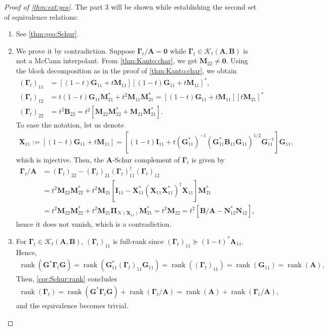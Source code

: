 \documentclass[noinfoline]{imsart}\setcounter{tocdepth}{2}
\newcommand{\m}[1]{\mathbf{#1}} %
\renewcommand{\c}[1]{\mathcal{#1}} %
\DeclareMathOperator*{\rk}{rank}
\theoremstyle{plain}
\begin{document}
\begin{proof}[Proof of \cref{thm:ext:geo}]
The part 3 will be shown while establishing the second set of equivalence relations:
\begin{enumerate}
\item [$(a \Rightarrow b)$] See \cref{thm:geo:Schur}.
\item [$(b \Rightarrow a)$] We prove it by contradiction. Suppose $\m{\Gamma}_{t}/\m{A} = \m{0}$ while $\m{\Gamma}_{t} \in \c{K}_{t}(\m{A}, \m{B})$ is not a McCann interpolant. From \cref{thm:Kanto:char}, we get $\m{M}_{22} \ne \m{0}$. Using the block decomposition as in the proof of \cref{thm:Kanto:char}, we obtain
\begin{align*}
    (\m{\Gamma}_{t})_{11} &= [(1-t) \m{G}_{11} + t \m{M}_{11}] [(1-t) \m{G}_{11} + t \m{M}_{11}]^{*}, \\
    (\m{\Gamma}_{t})_{12} &= t(1-t) \m{G}_{11} \m{M}_{21}^{*} + t^{2} \m{M}_{11} \m{M}_{21}^{*}
    = [(1-t) \m{G}_{11} + t \m{M}_{11}][t \m{M}_{21}]^{*} \\
    (\m{\Gamma}_{t})_{22} &= t^{2} \m{B}_{22} = t^{2}[\m{M}_{22} \m{M}_{22}^{*} + \m{M}_{21} \m{M}_{21}^{*}].
\end{align*}
To ease the notation, let us denote 
\begin{align*}
    \m{X}_{11} := [(1-t) \m{G}_{11} + t \m{M}_{11}] = [(1-t) \m{I}_{11} + t (\m{G}_{11}^{*})^{-1} (\m{G}_{11}^{*} \m{B}_{11} \m{G}_{11})^{1/2} \m{G}_{11}^{-1}] \m{G}_{11}, 
\end{align*}
which is injective. Then, the $\m{A}$-Schur complement of $\m{\Gamma}_{t}$ is given by
\begin{align*}
    \m{\Gamma}_{t}/\m{A} &= (\m{\Gamma}_{t})_{22} - (\m{\Gamma}_{t})_{21} (\m{\Gamma}_{t})_{11}^{\dagger} (\m{\Gamma}_{t})_{12} \\
    &= t^{2} \m{M}_{22} \m{M}_{22}^{*} + t^{2} \m{M}_{21} \left[ \m{I}_{11} - \m{X}_{11}^{*} (\m{X}_{11} \m{X}_{11}^{*})^{\dagger} \m{X}_{11}  \right] \m{M}_{21}^{*} \\
    &= t^{2} \m{M}_{22} \m{M}_{22}^{*} + t^{2} \m{M}_{21} \m{\Pi}_{\c{N}(\m{X}_{11})} \m{M}_{21}^{*} = t^{2} \m{M}_{22} = t^{2} [\m{B}/\m{A} - \m{N}_{12}^{*} \m{N}_{12}],
\end{align*}
hence it does not vanish, which is a contradiction.
\item [$(b \Leftrightarrow c)$] For $\m{\Gamma}_{t} \in \c{K}_{t}(\m{A}, \m{B})$, $(\m{\Gamma}_{t})_{11}$ is full-rank since $(\m{\Gamma}_{t})_{11} \succeq (1-t)^{*} \m{A}_{11}$. Hence,
\begin{align*}
    \rk (\m{G}^{*} \m{\Gamma}_{t} \m{G}) = \rk (\m{G}_{11}^{*} (\m{\Gamma}_{t})_{11} \m{G}_{11})
    = \rk ((\m{\Gamma}_{t})_{11}) = \rk (\m{G}_{11}) = \rk (\m{A}),
\end{align*}
Then, \cref{cor:Schur:rank} concludes
\begin{align*}
    \rk(\m{\Gamma}_{t}) = \rk (\m{G}^{*} \m{\Gamma}_{t} \m{G}) + \rk(\m{\Gamma}_{t}/\m{A}) = \rk (\m{A}) + \rk(\m{\Gamma}_{t}/\m{A}),
\end{align*}
and the equivalence becomes trivial.
\end{enumerate}
\end{proof}
\end{document}
